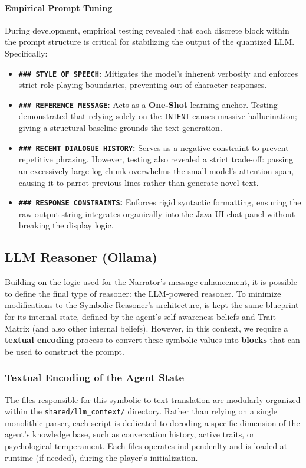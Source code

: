 \paragraph{Empirical Prompt Tuning}
During development, empirical testing revealed that each discrete block within the prompt structure is critical for stabilizing the output of the quantized LLM. Specifically:
\begin{itemize}
    \item \textbf{\texttt{\#\#\# STYLE OF SPEECH}:} Mitigates the model's inherent verbosity and enforces strict role-playing boundaries, preventing out-of-character responses.
    \item \textbf{\texttt{\#\#\# REFERENCE MESSAGE}:} Acts as a \textbf{One-Shot} learning anchor. Testing demonstrated that relying solely on the \texttt{INTENT} causes massive hallucination; giving a structural baseline grounds the text generation.
    \item \textbf{\texttt{\#\#\# RECENT DIALOGUE HISTORY}:} Serves as a negative constraint to prevent repetitive phrasing. However, testing also revealed a strict trade-off: passing an excessively large log chunk overwhelms the small model's attention span, causing it to parrot previous lines rather than generate novel text.
    \item \textbf{\texttt{\#\#\# RESPONSE CONSTRAINTS}:} Enforces rigid syntactic formatting, ensuring the raw output string integrates organically into the Java UI chat panel without breaking the display logic.
\end{itemize}

\subsection{LLM Reasoner (Ollama)}
\label{subsec:llm-reasoner}
Building on the logic used for the Narrator's message enhancement, it is possible to define the final type of reasoner: the LLM-powered reasoner. To minimize modifications to the Symbolic Reasoner's architecture, is kept the same blueprint for its internal state, defined by the agent's self-awareness beliefs and Trait Matrix (and also other internal beliefs). However, in this context, we require a \textbf{textual encoding} process to convert these symbolic values into \textbf{blocks} that can be used to construct the prompt.

\subsubsection{Textual Encoding of the Agent State}
\label{subsubsec:llm-reasoner-encoding}
The files responsible for this symbolic-to-text translation are modularly organized within the \texttt{shared/llm\_context/} directory. Rather than relying on a single monolithic parser, each script is dedicated to decoding a specific dimension of the agent's knowledge base, such as conversation history, active traits, or psychological temperament. Each files operates indipendenlty and is loaded at  runtime (if needed), during the player's initialization.


